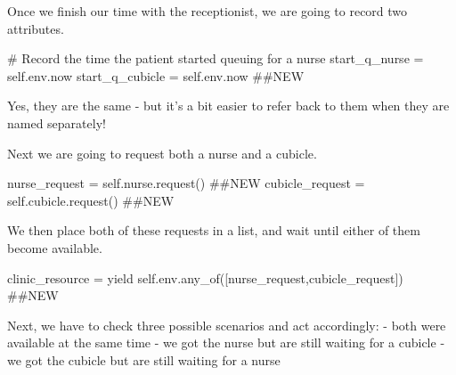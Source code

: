 \documentclass[
  letterpaper,
  DIV=11,
  numbers=noendperiod]{scrreprt}
\newenvironment{Shaded}{\begin{snugshade}}{\end{snugshade}}
\newcommand{\CommentTok}[1]{\textcolor[rgb]{0.37,0.37,0.37}{#1}}
\newcommand{\ControlFlowTok}[1]{\textcolor[rgb]{0.00,0.23,0.31}{#1}}
\newcommand{\NormalTok}[1]{\textcolor[rgb]{0.00,0.23,0.31}{#1}}
\newcommand{\OperatorTok}[1]{\textcolor[rgb]{0.37,0.37,0.37}{#1}}
\newcommand{\VariableTok}[1]{\textcolor[rgb]{0.07,0.07,0.07}{#1}}
\begin{document}
Once we finish our time with the receptionist, we are going to record
two attributes.

\begin{Shaded}
\begin{Highlighting}[]
\CommentTok{\# Record the time the patient started queuing for a nurse}
\NormalTok{start\_q\_nurse }\OperatorTok{=} \VariableTok{self}\NormalTok{.env.now}
\NormalTok{start\_q\_cubicle }\OperatorTok{=} \VariableTok{self}\NormalTok{.env.now }\CommentTok{\#\#NEW}
\end{Highlighting}
\end{Shaded}

Yes, they are the same - but it's a bit easier to refer back to them
when they are named separately!

Next we are going to request both a nurse and a cubicle.

\begin{Shaded}
\begin{Highlighting}[]
\NormalTok{nurse\_request }\OperatorTok{=} \VariableTok{self}\NormalTok{.nurse.request()  }\CommentTok{\#\#NEW}
\NormalTok{cubicle\_request }\OperatorTok{=} \VariableTok{self}\NormalTok{.cubicle.request() }\CommentTok{\#\#NEW}
\end{Highlighting}
\end{Shaded}

We then place both of these requests in a list, and wait until either of
them become available.

\begin{Shaded}
\begin{Highlighting}[]
\NormalTok{clinic\_resource }\OperatorTok{=} \ControlFlowTok{yield} \VariableTok{self}\NormalTok{.env.any\_of([nurse\_request,cubicle\_request]) }\CommentTok{\#\#NEW}
\end{Highlighting}
\end{Shaded}

Next, we have to check three possible scenarios and act accordingly: -
both were available at the same time - we got the nurse but are still
waiting for a cubicle - we got the cubicle but are still waiting for a
nurse
\end{document}
